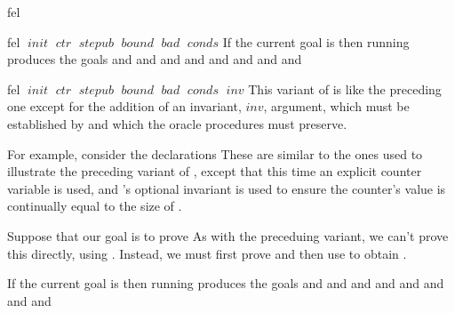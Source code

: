 \begin{tactic}{fel}
\begin{tsyntax}{fel $\;\mathit{init}$ $\;\mathit{ctr}$ $\;\mathit{stepub}$
                      $\;\mathit{bound}$ $\;\mathit{bad}$ $\;\mathit{conds}$}
    If the current goal is
     then
    running 
    produces the goals
    and
    and
    and
    and
    and
    and
    and
    and
  \end{tsyntax}

  \begin{tsyntax}{fel $\;\mathit{init}$ $\;\mathit{ctr}$ $\;\mathit{stepub}$
                      $\;\mathit{bound}$ $\;\mathit{bad}$ $\;\mathit{conds}$
                      $\;\mathit{inv}$}
    This variant of  is like the preceding one except for
    the addition of an invariant, $\mathit{inv}$, argument, which must be
    established by  and which the oracle procedures must
    preserve.

    \medskip For example, consider the declarations
    These are similar to the ones used to illustrate the preceding
    variant of , except that this time an explicit counter
    variable  is used, and 's optional invariant
    is used to ensure the counter's value is continually equal
    to the size of .

    Suppose that our goal is to prove
     As with the
    preceduing variant, we can't prove this directly, using
    . Instead, we must first prove
     and then use
     to obtain .

    If the current goal is
     then
    running 
    produces the goals
    and
    and
    and
    and
    and
    and
    and
    and
  \end{tsyntax}
\end{tactic}
